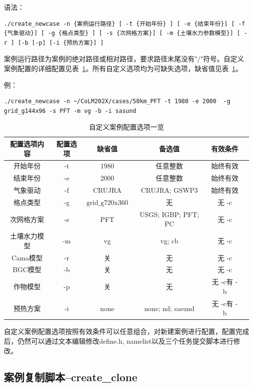\documentclass[a4paper,12pt,twoside]{article}
\begin{document}
语法：
\begin{lstlisting}
./create_newcase -n {案例运行路径} [ -t {开始年份} ] [ -e {结束年份}] [ -f {气象驱动}] [ -g {格点类型} ] [ -s {次网格方案}] [ -m {土壤水力参数模型}] [ -r ] [-b [-p] [-i {预热方案}] ]  
\end{lstlisting}

案例运行路径为案例的绝对路径或相对路径，要求路径末尾没有"/"符号。自定义案例配置的详细配置见表~\ref{tab:custom_option}。所有自定义选项均为可缺失选项，缺省值见表~\ref{tab:custom_option}。

例：
\begin{lstlisting}
./create_newcase -n ~/CoLM202X/cases/50km_PFT -t 1980 -e 2000  -g grid_g144x96 -s PFT -m vg -b -i sasund 
\end{lstlisting}

\begin{table}[!htbp]
\renewcommand{\arraystretch}{1.5}
\centering 
\caption{自定义案例配置选项一览}\label{tab:custom_option}
\begin{tabular}{
cccccc} \toprule
\textbf{配置选项内容} & \textbf{配置选项} & \textbf{缺省值} & \textbf{备选值} & \textbf{有效条件}\\ \midrule
开始年份 & -t & 1980 & 任意整数 & 始终有效\\
结束年份 & -e & 2000 & 任意整数 & 始终有效\\
气象驱动 & -f & CRUJRA & CRUJRA; GSWP3  & 始终有效\\
格点类型 & -g & $\mathrm{grid}\_\mathrm{g}720\mathrm{x}360$ & 无& 无 -c\\
次网格方案 & -s & PFT & USGS; IGBP; PFT; PC & 无 -c\\
土壤水力模型 & -m & vg & vg; cb& 无 -c\\
Cama模型 & -r & 关 & 无& 无 -c\\
BGC模型 & -b & 关 & 无& 无 -c\\
作物模型 & -p & 关 & 无& 无 -c有 -b\\
预热方案 & -i & none & none; nd; sasund& 无 -c有 -b\\
\bottomrule
\end{tabular}
\end{table}

自定义案例配置选项按照有效条件可以任意组合，对新建案例进行配置，配置完成后，仍然可以通过文本编辑修改define.h, namelist以及三个任务提交脚本进行修改。

\subsection{案例复制脚本--create\_clone}
\end{document}
